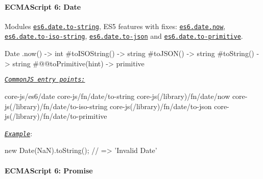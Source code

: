  \paragraph*{E\+C\+M\+A\+Script 6\+: Date}

Modules \href{https://github.com/zloirock/core-js/blob/v2.6.0/modules/es6.date.to-string.js}{\tt {\ttfamily es6.\+date.\+to-\/string}}, E\+S5 features with fixes\+: \href{https://github.com/zloirock/core-js/blob/v2.6.0/modules/es6.date.now.js}{\tt {\ttfamily es6.\+date.\+now}}, \href{https://github.com/zloirock/core-js/blob/v2.6.0/modules/es6.date.to-iso-string.js}{\tt {\ttfamily es6.\+date.\+to-\/iso-\/string}}, \href{https://github.com/zloirock/core-js/blob/v2.6.0/modules/es6.date.to-json.js}{\tt {\ttfamily es6.\+date.\+to-\/json}} and \href{https://github.com/zloirock/core-js/blob/v2.6.0/modules/es6.date.to-primitive.js}{\tt {\ttfamily es6.\+date.\+to-\/primitive}}. 
\begin{DoxyCode}
Date
  .now()               -> int
  #toISOString()       -> string
  #toJSON()            -> string
  #toString()          -> string
  #@@toPrimitive(hint) -> primitive
\end{DoxyCode}
 \href{#commonjs}{\tt {\itshape Common\+JS entry points\+:}} 
\begin{DoxyCode}
core-js/es6/date
core-js/fn/date/to-string
core-js(/library)/fn/date/now
core-js(/library)/fn/date/to-iso-string
core-js(/library)/fn/date/to-json
core-js(/library)/fn/date/to-primitive
\end{DoxyCode}
 \href{http://goo.gl/haeHLR}{\tt {\itshape Example}}\+: 
\begin{DoxyCode}
new Date(NaN).toString(); // => 'Invalid Date'
\end{DoxyCode}


\paragraph*{E\+C\+M\+A\+Script 6\+: Promise}


